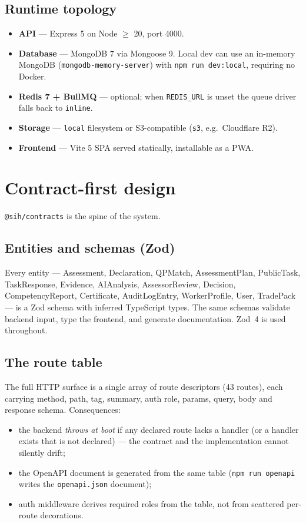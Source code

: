 \documentclass[11pt,a4paper]{article}
\newcommand{\code}[1]{\texttt{\small #1}}
\begin{document}
\subsection{Runtime topology}
\begin{itemize}
\item \textbf{API} --- Express 5 on Node $\ge$ 20, port 4000.
\item \textbf{Database} --- MongoDB 7 via Mongoose 9. Local dev can use an
      in-memory MongoDB (\code{mongodb-memory-server}) with \code{npm run
      dev:local}, requiring no Docker.
\item \textbf{Redis 7 + BullMQ} --- optional; when \code{REDIS_URL} is unset
      the queue driver falls back to \code{inline}.
\item \textbf{Storage} --- \code{local} filesystem or S3-compatible
      (\code{s3}, e.g.\ Cloudflare R2).
\item \textbf{Frontend} --- Vite 5 SPA served statically, installable as a
      PWA.
\end{itemize}

\section{Contract-first design}
\code{@sih/contracts} is the spine of the system.

\subsection{Entities and schemas (Zod)}
Every entity --- Assessment, Declaration, QPMatch, AssessmentPlan, PublicTask,
TaskResponse, Evidence, AIAnalysis, AssessorReview, Decision, CompetencyReport,
Certificate, AuditLogEntry, WorkerProfile, User, TradePack --- is a Zod schema
with inferred TypeScript types. The same schemas validate backend input, type
the frontend, and generate documentation. Zod~4 is used throughout.

\subsection{The route table}
The full HTTP surface is a single array of route descriptors (43 routes),
each carrying method, path, tag, summary, auth role, params, query, body and
response schema. Consequences:
\begin{itemize}
\item the backend \emph{throws at boot} if any declared route lacks a handler
      (or a handler exists that is not declared) --- the contract and the
      implementation cannot silently drift;
\item the OpenAPI document is generated from the same table
      (\code{npm run openapi} writes the \code{openapi.json} document);
\item auth middleware derives required roles from the table, not from
      scattered per-route decorations.
\end{itemize}
\end{document}
